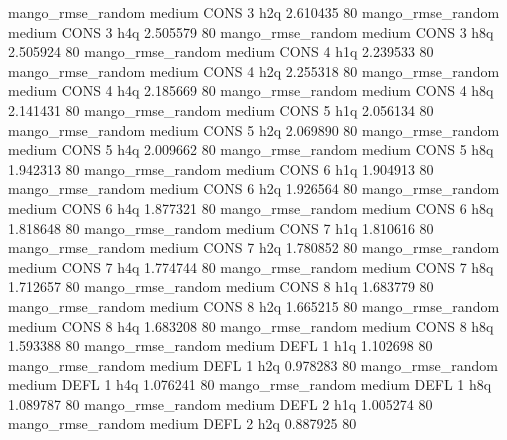mango_rmse_random     medium     CONS                 3                  h2q  2.610435 80
mango_rmse_random     medium     CONS                 3                  h4q  2.505579 80
mango_rmse_random     medium     CONS                 3                  h8q  2.505924 80
mango_rmse_random     medium     CONS                 4                  h1q  2.239533 80
mango_rmse_random     medium     CONS                 4                  h2q  2.255318 80
mango_rmse_random     medium     CONS                 4                  h4q  2.185669 80
mango_rmse_random     medium     CONS                 4                  h8q  2.141431 80
mango_rmse_random     medium     CONS                 5                  h1q  2.056134 80
mango_rmse_random     medium     CONS                 5                  h2q  2.069890 80
mango_rmse_random     medium     CONS                 5                  h4q  2.009662 80
mango_rmse_random     medium     CONS                 5                  h8q  1.942313 80
mango_rmse_random     medium     CONS                 6                  h1q  1.904913 80
mango_rmse_random     medium     CONS                 6                  h2q  1.926564 80
mango_rmse_random     medium     CONS                 6                  h4q  1.877321 80
mango_rmse_random     medium     CONS                 6                  h8q  1.818648 80
mango_rmse_random     medium     CONS                 7                  h1q  1.810616 80
mango_rmse_random     medium     CONS                 7                  h2q  1.780852 80
mango_rmse_random     medium     CONS                 7                  h4q  1.774744 80
mango_rmse_random     medium     CONS                 7                  h8q  1.712657 80
mango_rmse_random     medium     CONS                 8                  h1q  1.683779 80
mango_rmse_random     medium     CONS                 8                  h2q  1.665215 80
mango_rmse_random     medium     CONS                 8                  h4q  1.683208 80
mango_rmse_random     medium     CONS                 8                  h8q  1.593388 80
mango_rmse_random     medium     DEFL                 1                  h1q  1.102698 80
mango_rmse_random     medium     DEFL                 1                  h2q  0.978283 80
mango_rmse_random     medium     DEFL                 1                  h4q  1.076241 80
mango_rmse_random     medium     DEFL                 1                  h8q  1.089787 80
mango_rmse_random     medium     DEFL                 2                  h1q  1.005274 80
mango_rmse_random     medium     DEFL                 2                  h2q  0.887925 80
